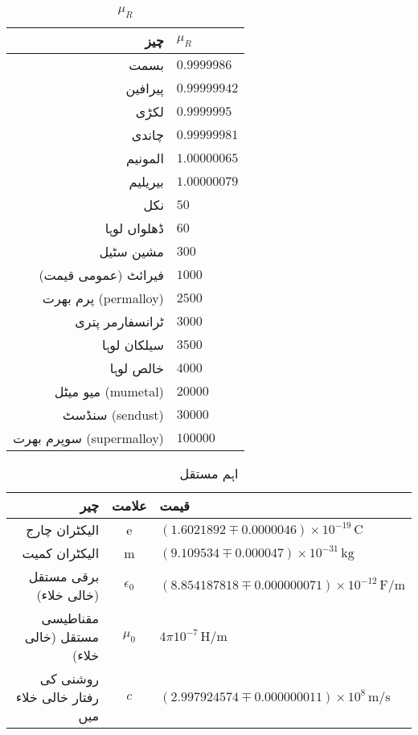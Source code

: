 {\renewcommand{\arraystretch}{1.2}
\begin{table}
\caption{$\mu_R$}
\centering
\begin{tabular}{r | l}
\hline
چیز & $\mu_R$ \\
\hline
بسمت & $\num{0.9999986}$\\
پیرافین & $\num{0.99999942}$\\
لکڑی & $\num{0.9999995}$\\
چاندی & $\num{0.99999981}$\\
المونیم & $\num{1.00000065}$\\
بیریلیم & $\num{1.00000079}$\\
نکل & $\num{50}$\\
ڈھلواں لوہا & $\num{60}$\\
مشین سٹیل & $\num{300}$\\
فیرائٹ (عمومی قیمت) & $\num{1000}$\\
پرم بھرت (permalloy) & $\num{2500}$\\
ٹرانسفارمر پتری & $\num{3000}$\\
سیلکان لوہا & $\num{3500}$\\
خالص لوہا & $\num{4000}$\\
میو میٹل (mumetal) & $\num{20000}$\\
سنڈسٹ (sendust) & $\num{30000}$\\
سوپرم بھرت (supermalloy) & $\num{100000}$\\
\end{tabular}
\label{جدول_جدول_جزوی_مقناطیسی_مستقل}
\end{table}
}
{\renewcommand{\arraystretch}{1.2}
\begin{table}
\caption{اہم مستقل}
\centering
\begin{tabular}{r |c | l}
\hline
چیر & علامت & قیمت\\
\hline
الیکٹران چارج & e & $(\num{1.6021892} \mp \num{0.0000046})\times 10^{-19} \, \si{\coulomb}$\\
الیکٹران کمیت & m & $(\num{9.109534} \mp  \num{0.000047}) \times 10^{-31} \, \si{\kilogram}$\\
برقی مستقل (خالی خلاء) & $\epsilon_0$ & $(\num{8.854187818} \mp \num{0.000000071} ) \times 10^{-12} \, \si{\farad \per \meter}$\\
مقناطیسی مستقل (خالی خلاء) & $\mu_0$  &   $4 \pi 10^{-7} \, \si{\henry \per \meter}$\\
روشنی کی رفتار {خالی خلاء میں} & $c$ & $(\num{2.997924574} \mp \num{0.000000011}) \times 10^{8} \, \si{\meter \per \second}$\\
\end{tabular}
\label{جدول-جدول_اہم_مستقل}
\end{table}
}
